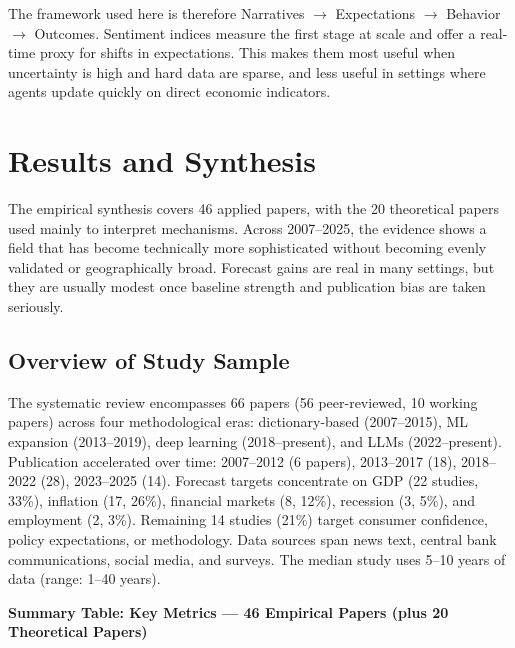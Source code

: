 \documentclass[12pt,oneside]{article}
\begin{document}
The framework used here is therefore Narratives $\rightarrow$ Expectations $\rightarrow$ Behavior $\rightarrow$ Outcomes. Sentiment indices measure the first stage at scale and offer a real-time proxy for shifts in expectations. This makes them most useful when uncertainty is high and hard data are sparse, and less useful in settings where agents update quickly on direct economic indicators.

\section{Results and Synthesis}

The empirical synthesis covers 46 applied papers, with the 20 theoretical papers used mainly to interpret mechanisms. Across 2007--2025, the evidence shows a field that has become technically more sophisticated without becoming evenly validated or geographically broad. Forecast gains are real in many settings, but they are usually modest once baseline strength and publication bias are taken seriously.

\subsection{Overview of Study Sample}

The systematic review encompasses 66 papers (56 peer-reviewed, 10 working papers) across four methodological eras: dictionary-based (2007--2015), ML expansion (2013--2019), deep learning (2018--present), and LLMs (2022--present). Publication accelerated over time: 2007--2012 (6 papers), 2013--2017 (18), 2018--2022 (28), 2023--2025 (14). Forecast targets concentrate on GDP (22 studies, 33\%), inflation (17, 26\%), financial markets (8, 12\%), recession (3, 5\%), and employment (2, 3\%). Remaining 14 studies (21\%) target consumer confidence, policy expectations, or methodology. Data sources span news text, central bank communications, social media, and surveys. The median study uses 5--10 years of data (range: 1--40 years).


\noindent\textbf{Summary Table: Key Metrics — 46 Empirical Papers (plus 20 Theoretical Papers)}
\end{document}
